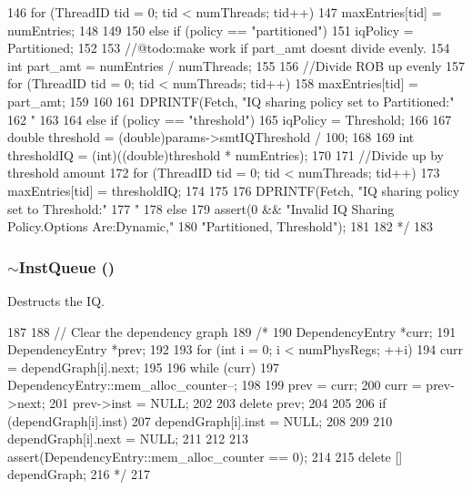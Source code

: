 \begin{DoxyCode}
{{146         for (ThreadID tid = 0; tid < numThreads; tid++) {
147             maxEntries[tid] = numEntries;
148         }
149 
150     } else if (policy == "partitioned") {
151         iqPolicy = Partitioned;
152 
153         //@todo:make work if part_amt doesnt divide evenly.
154         int part_amt = numEntries / numThreads;
155 
156         //Divide ROB up evenly
157         for (ThreadID tid = 0; tid < numThreads; tid++) {
158             maxEntries[tid] = part_amt;
159         }
160 
161         DPRINTF(Fetch, "IQ sharing policy set to Partitioned:"
162                 "%
163 
164     } else if (policy == "threshold") {
165         iqPolicy = Threshold;
166 
167         double threshold =  (double)params->smtIQThreshold / 100;
168 
169         int thresholdIQ = (int)((double)threshold * numEntries);
170 
171         //Divide up by threshold amount
172         for (ThreadID tid = 0; tid < numThreads; tid++) {
173             maxEntries[tid] = thresholdIQ;
174         }
175 
176         DPRINTF(Fetch, "IQ sharing policy set to Threshold:"
177                 "%
178    } else {
179        assert(0 && "Invalid IQ Sharing Policy.Options Are:{Dynamic,"
180               "Partitioned, Threshold}");
181    }
182 */
183 }
\end{DoxyCode}
\hypertarget{classInstQueue_aac3885a1c3df6261e14208fc83713c17}{
\subsubsection[{$\sim$InstQueue}]{\setlength{\rightskip}{0pt plus 5cm}$\sim${\bf InstQueue} ()}}
\label{classInstQueue_aac3885a1c3df6261e14208fc83713c17}
Destructs the IQ. 


\begin{DoxyCode}
187 {
188     // Clear the dependency graph
189 /*
190     DependencyEntry *curr;
191     DependencyEntry *prev;
192 
193     for (int i = 0; i < numPhysRegs; ++i) {
194         curr = dependGraph[i].next;
195 
196         while (curr) {
197             DependencyEntry::mem_alloc_counter--;
198 
199             prev = curr;
200             curr = prev->next;
201             prev->inst = NULL;
202 
203             delete prev;
204         }
205 
206         if (dependGraph[i].inst) {
207             dependGraph[i].inst = NULL;
208         }
209 
210         dependGraph[i].next = NULL;
211     }
212 
213     assert(DependencyEntry::mem_alloc_counter == 0);
214 
215     delete [] dependGraph;
216 */
217 }
\end{DoxyCode}


